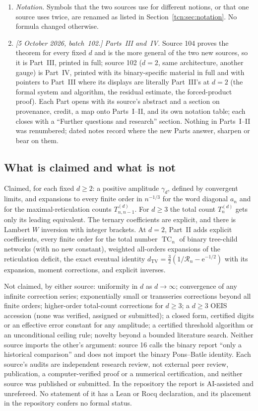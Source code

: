 \documentclass[11pt,letterpaper]{article}
\newcommand{\ee}{\mathrm e}
\newcommand{\TC}{\operatorname{TC}}
\theoremstyle{remark}
\begin{document}
\begin{enumerate}[itemsep=2pt]
\item \emph{Notation.} Symbols that the two sources use for different notions, or that one source uses twice, are renamed as listed in Section~\ref{tcn:sec:notation}. No formula changed otherwise.
\item \emph{[5 October 2026, batch~102.] Parts~III and~IV.} Source 104 proves the theorem for every fixed $d$ and is the more general of the two new sources, so it is Part~III, printed in full; source 102 ($d=2$, same architecture, another gauge) is Part~IV, printed with its binary-specific material in full and with pointers to Part~III where its displays are literally Part~III's at $d=2$ (the formal system and algorithm, the residual estimate, the forced-product proof). Each Part opens with its source's abstract and a section on provenance, credit, a map onto Parts~I--II, and its own notation table; each closes with a ``Further questions and research'' section. Nothing in Parts~I--II was renumbered; dated notes record where the new Parts answer, sharpen or bear on them.
\end{enumerate}

\subsection{What is claimed and what is not}\label{tcn:sec:scope}
Claimed, for each fixed $d\ge2$: a positive amplitude $\gamma_d$, defined by convergent limits, and expansions to every finite order in $n^{-1/3}$ for the word diagonal $a_n$ and for the maximal-reticulation counts $T^{(d)}_{n,n-1}$. For $d\ge3$ the total count $T^{(d)}_n$ gets only its leading equivalent. The ternary coefficients are explicit, and there is Lambert $W$ inversion with integer brackets. At $d=2$, Part~II adds explicit coefficients, every finite order for the total number $\TC_n$ of binary tree-child networks (with no new constant), weighted all-orders expansions of the reticulation deficit, the exact eventual identity $d_{\mathrm{TV}}=\tfrac32(1/\mathcal R_n-\ee^{-1/2})$ with its expansion, moment corrections, and explicit inverses.

Not claimed, by either source: uniformity in $d$ as $d\to\infty$; convergence of any infinite correction series; exponentially small or transseries corrections beyond all finite orders; higher-order total-count corrections for $d\ge3$; a $d\ge3$ OEIS accession (none was verified, assigned or submitted); a closed form, certified digits or an effective error constant for any amplitude; a certified threshold algorithm or an unconditional ceiling rule; novelty beyond a bounded literature search. Neither source imports the other's argument: source 16 calls the binary report ``only a historical comparison'' and does not import the binary Pons--Batle identity. Each source's audits are independent research review, not external peer review, publication, a computer-verified proof or a numerical certification, and neither source was published or submitted. In the repository the report is AI-assisted and unrefereed. No statement of it has a Lean or Rocq declaration, and its placement in the repository confers no formal status.
\end{document}
